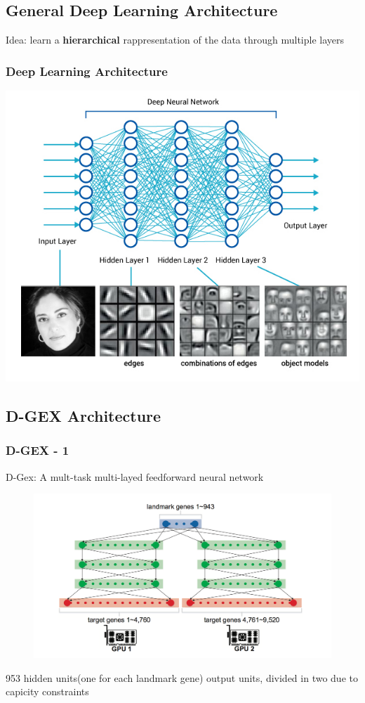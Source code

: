 \documentclass[professionalfont]{beamer}
\begin{document}
  \subsection{General Deep Learning Architecture}
	\begin{frame}
	  Idea: learn a \textbf{hierarchical} rappresentation of the data through multiple layers
	  \frametitle{Deep Learning Architecture}
	  \begin{center}
	    \includegraphics[scale=0.35]{deep_learning_net.jpg}
	  \end{center}
	\end{frame}

  \subsection{D-GEX Architecture}
  \begin{frame}
    \frametitle{D-GEX - 1}
    D-Gex: A mult-task multi-layed feedforward neural network
    \begin{figure}
      \centering
      \includegraphics[scale=0.35]{figures/dgexarch.png}
    \end{figure}
    953 hidden units(one for each landmark gene) output units, divided in two due to capicity constraints
  \end{frame}
\end{document}
